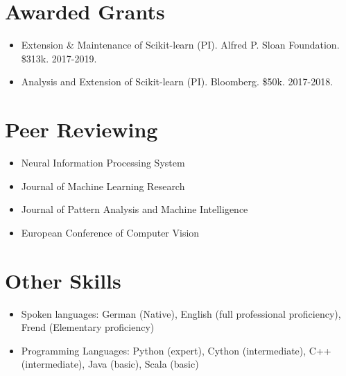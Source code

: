 \documentclass[a4paper,11pt]{article}
\begin{document}
\section{Awarded Grants}
\begin{itemize}
    \item Extension & Maintenance of Scikit-learn (PI). Alfred P. Sloan Foundation. \$313k. 2017-2019.
    \item Analysis and Extension of Scikit-learn (PI). Bloomberg. \$50k. 2017-2018.
\end{itemize}

\section{Peer Reviewing}
\begin{itemize}
    \item Neural Information Processing System
    \item Journal of Machine Learning Research
    \item Journal of Pattern Analysis and Machine Intelligence
    \item European Conference of Computer Vision
\end{itemize}

\section{Other Skills}
\begin{itemize}
    \item Spoken languages: German (Native), English (full professional proficiency), Frend (Elementary proficiency)
    \item Programming Languages: Python (expert), Cython (intermediate), C++ (intermediate), Java (basic), Scala (basic)
\end{itemize}

\begin{publications}
\end{publications}
\end{document}
